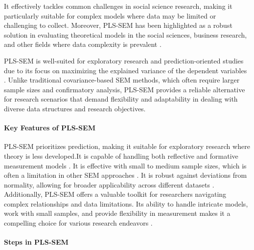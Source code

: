 It effectively tackles common challenges in social science research, making it particularly suitable for complex models where data may be limited or challenging to collect. Moreover, PLS-SEM has been highlighted as a robust solution in evaluating theoretical models in the social sciences, business research, and other fields where data complexity is prevalent \parencite{Sarstedt2017PartialModeling}.

PLS-SEM is well-suited for exploratory research and prediction-oriented studies due to its focus on maximizing the explained variance of the dependent variables \parencite{Henseler2015AModeling}. Unlike traditional covariance-based SEM methods, which often require larger sample sizes and confirmatory analysis, PLS-SEM provides a reliable alternative for research scenarios that demand flexibility and adaptability in dealing with diverse data structures and research objectives.

\paragraph{Key Features of PLS-SEM}

PLS-SEM prioritizes prediction, making it suitable for exploratory research where theory is less developed.It is capable of handling both reflective and formative measurement models \parencite{Chin1998TheModeling}. It is effective with small to medium sample sizes, which is often a limitation in other SEM approaches \parencite{Sarstedt2017PartialModeling}. It is robust against deviations from normality, allowing for broader applicability across different datasets \parencite{Henseler2015AModeling}. Additionally, PLS-SEM offers a valuable toolkit for researchers navigating complex relationships and data limitations. Its ability to handle intricate models, work with small samples, and provide flexibility in measurement makes it a compelling choice for various research endeavors \parencite{Tenenhaus2005PLSModeling}.

\paragraph{Steps in PLS-SEM}

